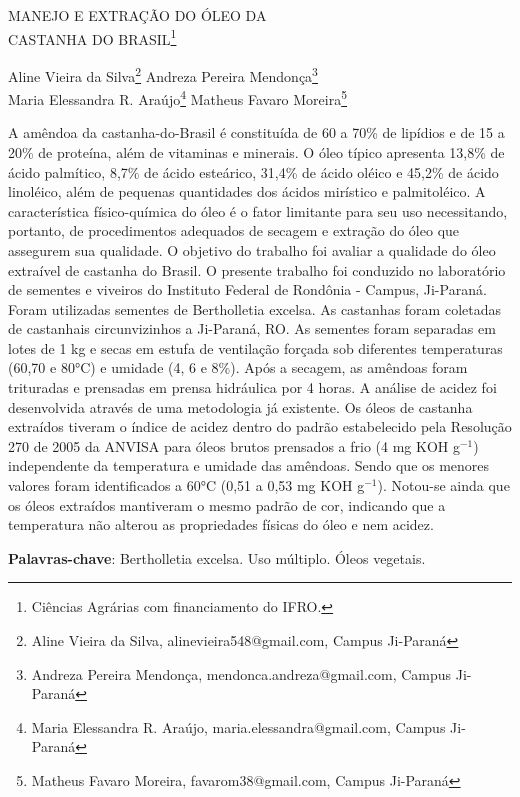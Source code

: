 \documentclass[article,12pt,onesidea,4paper,english,brazil]{abntex2}
\begin{document}
	
	
	\frenchspacing 
	
	\begin{center}
		\LARGE MANEJO E EXTRAÇÃO DO ÓLEO DA\\CASTANHA DO BRASIL\footnote{Ciências Agrárias com financiamento do IFRO.}
		
		\normalsize
		Aline Vieira da Silva\footnote{Aline Vieira da Silva, alinevieira548@gmail.com, Campus Ji-Paraná} 
		Andreza Pereira Mendonça\footnote{Andreza Pereira Mendonça, mendonca.andreza@gmail.com, Campus Ji-Paraná} \\ 
		Maria Elessandra R. Araújo\footnote{Maria Elessandra R. Araújo, maria.elessandra@gmail.com, Campus Ji-Paraná} 
		Matheus Favaro
		Moreira\footnote{Matheus Favaro Moreira, favarom38@gmail.com, Campus Ji-Paraná} 
	\end{center}
	
	\noindent A amêndoa da castanha-do-Brasil é constituída de 60 a 70\% de lipídios e de 15 a
	20\% de proteína, além de vitaminas e minerais. O óleo típico apresenta 13,8\% de
	ácido palmítico, 8,7\% de ácido esteárico, 31,4\% de ácido oléico e 45,2\% de ácido
	linoléico, além de pequenas quantidades dos ácidos mirístico e palmitoléico. A
	característica físico-química do óleo é o fator limitante para seu uso necessitando,
	portanto, de procedimentos adequados de secagem e extração do óleo que
	assegurem sua qualidade. O objetivo do trabalho foi avaliar a qualidade do óleo
	extraível de castanha do Brasil. O presente trabalho foi conduzido no laboratório de
	sementes e viveiros do Instituto Federal de Rondônia - Campus, Ji-Paraná. Foram
	utilizadas sementes de Bertholletia excelsa. As castanhas foram coletadas de
	castanhais circunvizinhos a Ji-Paraná, RO. As sementes foram separadas em lotes
	de 1 kg e secas em estufa de ventilação forçada sob diferentes temperaturas (60,70
	e 80°C) e umidade (4, 6 e 8\%). Após a secagem, as amêndoas foram trituradas e
	prensadas em prensa hidráulica por 4 horas. A análise de acidez foi desenvolvida
	através de uma metodologia já existente. Os óleos de castanha extraídos tiveram o
	índice de acidez dentro do padrão estabelecido pela Resolução 270 de 2005 da
	ANVISA para óleos brutos prensados a frio (4 mg KOH g$^{-1}$) independente da temperatura e umidade das amêndoas. Sendo que os menores valores foram identificados a 60°C (0,51 a 0,53 mg KOH g$^{-1}$). Notou-se ainda que os óleos
	extraídos mantiveram o mesmo padrão de cor, indicando que a temperatura não
	alterou as propriedades físicas do óleo e nem acidez.
	
	\vspace{\onelineskip}
	
	\noindent
	\textbf{Palavras-chave}: Bertholletia excelsa. Uso múltiplo. Óleos vegetais.
	
\end{document}

